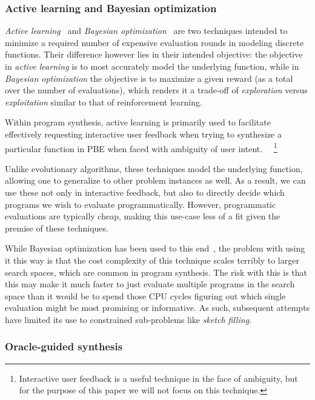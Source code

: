 \documentclass{article}
\begin{document}
\subsubsection{Active learning and Bayesian optimization}

\emph{Active learning}~\citep{settles2009active} and
\emph{Bayesian optimization}~\citep{mockus2012bayesian}
are two techniques intended to minimize a required number of
expensive evaluation rounds in modeling discrete functions.
Their difference however lies in their intended objective:
the objective in \emph{active learning} is to most accurately
model the underlying function, while in
\emph{Bayesian optimization} the objective is to maximize
a given reward (as a total over the number of evaluations),
which renders it a trade-off of \emph{exploration} versus
\emph{exploitation} similar to that of reinforcement learning.

Within program synthesis, active learning is primarily used to
facilitate effectively requesting interactive user feedback when
trying to synthesize a particular function in PBE when faced
with ambiguity of user intent.~\citep{shen2019using}%
~\footnote{
    Interactive user feedback is a useful technique in the face of ambiguity,
    but for the purpose of this paper we will not focus on this technique.
}

Unlike evolutionary algorithms, these techniques model the underlying function,
allowing one to generalize to other problem instances as well.
As a result, we can use these not only in interactive feedback,
but also to directly decide which programs we wish to evaluate programmatically.
However, programmatic evaluations are typically cheap,
making this use-case less of a fit given the premise of these techniques.

While Bayesian optimization has been used to this end~\citep{looks2005learning},
the problem with using it this way is that the cost complexity of this technique
scales terribly to larger search spaces, which are common in program synthesis.
The risk with this is that this may make it much faster to just evaluate
multiple programs in the search space than it would be to spend those CPU cycles
figuring out which single evaluation might be most promising or informative.
As such, subsequent attempts have limited its use to constrained
sub-problems like \emph{sketch filling}.~\citep{verma2018programmatically}

\subsubsection{Oracle-guided synthesis}
\end{document}
